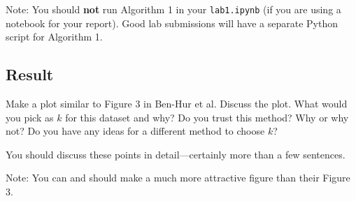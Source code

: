 \documentclass[letterpaper,12pt]{article}
\begin{document}
Note: You should \textbf{not} run Algorithm 1 in your \texttt{lab1.ipynb} (if you are using a notebook for your report). Good lab submissions will have a separate Python script for Algorithm 1.

\subsection{Result}
Make a plot similar to Figure 3 in Ben-Hur et al. Discuss the plot. What would you pick as $k$ for this dataset and why? Do you trust this method? Why or why not? Do you have any ideas for a different method to choose $k$?

You should discuss these points in detail---certainly more than a few sentences.

Note: You can and should make a much more attractive figure than their Figure 3.
\end{document}
